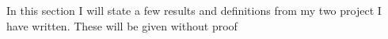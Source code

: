 \documentclass[../main.tex]{subfiles}
\begin{document}
In this section I will state a few results and definitions from my two project I have written.
These will be given without proof
\end{document}
